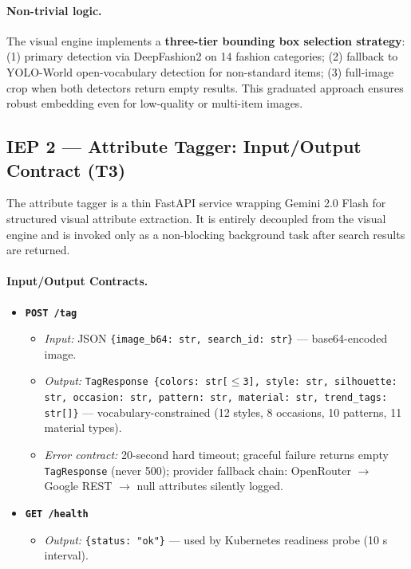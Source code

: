 \documentclass[12pt]{article}
\begin{document}
\paragraph{Non-trivial logic.} The visual engine implements a \textbf{three-tier bounding box selection strategy}: (1) primary detection via DeepFashion2 on 14 fashion categories; (2) fallback to YOLO-World open-vocabulary detection for non-standard items; (3) full-image crop when both detectors return empty results. This graduated approach ensures robust embedding even for low-quality or multi-item images.

\subsection{IEP 2 --- Attribute Tagger: Input/Output Contract (T3)}

The attribute tagger is a thin FastAPI service wrapping Gemini 2.0 Flash for structured visual attribute extraction. It is entirely decoupled from the visual engine and is invoked only as a non-blocking background task after search results are returned.

\paragraph{Input/Output Contracts.}

\begin{itemize}[leftmargin=*]
  \item \textbf{\texttt{POST /tag}}
    \begin{itemize}
      \item \emph{Input:} JSON \texttt{\{image\_b64: str, search\_id: str\}} --- base64-encoded image.
      \item \emph{Output:} \texttt{TagResponse \{colors: str[$\le$3], style: str, silhouette: str, occasion: str, pattern: str, material: str, trend\_tags: str[]\}} --- vocabulary-constrained (12 styles, 8 occasions, 10 patterns, 11 material types).
      \item \emph{Error contract:} 20-second hard timeout; graceful failure returns empty \texttt{TagResponse} (never 500); provider fallback chain: OpenRouter $\to$ Google REST $\to$ null attributes silently logged.
    \end{itemize}

  \item \textbf{\texttt{GET /health}}
    \begin{itemize}
      \item \emph{Output:} \texttt{\{status: "ok"\}} --- used by Kubernetes readiness probe (10 s interval).
    \end{itemize}
\end{itemize}
\end{document}
